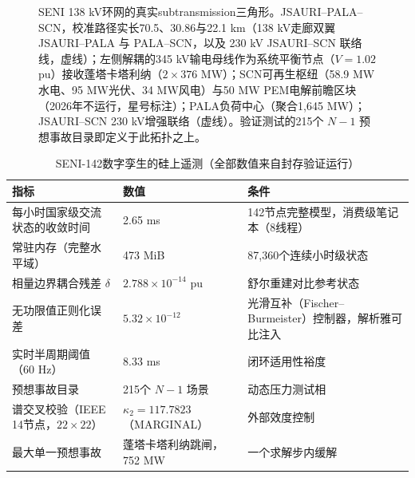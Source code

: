 \begin{figure}[!t]
\centering
\resizebox{0.85\textwidth}{!}{}
\caption{SENI 138 kV环网的真实subtransmission三角形。JSAURI--PALA--SCN，校准路径实长70.5、30.86与22.1 km（138 kV走廊双翼 JSAURI--PALA 与 PALA--SCN，以及 230 kV JSAURI--SCN 联络线，虚线）；左侧解耦的345 kV输电母线作为系统平衡节点（$V = 1.02$ pu）接收蓬塔卡塔利纳（$2 \times 376$ MW）；SCN可再生枢纽（58.9 MW水电、95 MW光伏、34 MW风电）与50 MW PEM电解前瞻区块（2026年不运行，星号标注）；PALA负荷中心（聚合1,645 MW）；JSAURI--SCN 230 kV增强联络（虚线）。验证测试的215个 $N-1$ 预想事故目录即定义于此拓扑之上。}
\label{fig:topologia_seni}
\end{figure}

\begin{table}[!t]
\caption{SENI-142数字孪生的硅上遥测（全部数值来自封存验证运行）}
\label{tab:telemetry}
\centering
\footnotesize
\begin{tabular}{@{}p{} p{} p{}@{}}
\toprule
\textbf{指标} & \textbf{数值} & \textbf{条件} \\
\midrule
每小时国家级交流状态的收敛时间 & 2.65 ms & 142节点完整模型，消费级笔记本（8线程） \\
常驻内存（完整水平域） & 473 MiB & 87,360个连续小时级状态 \\
相量边界耦合残差 $\delta$ & $2.788 \times 10^{-14}$ pu & 舒尔重建对比参考状态 \\
无功限值正则化误差 & $5.32 \times 10^{-12}$ & 光滑互补（Fischer--Burmeister）控制器，解析雅可比注入 \\
实时半周期阈值（60 Hz） & 8.33 ms & 闭环适用性裕度 \\
预想事故目录 & 215个 $N-1$ 场景 & 动态压力测试相 \\
谱交叉校验（IEEE 14节点，$22\times22$） & $\kappa_2 = 117.7823$（MARGINAL） & 外部效度控制 \\
最大单一预想事故 & 蓬塔卡塔利纳跳闸，752 MW & 一个求解步内缓解 \\
\bottomrule
\end{tabular}
\end{table}
